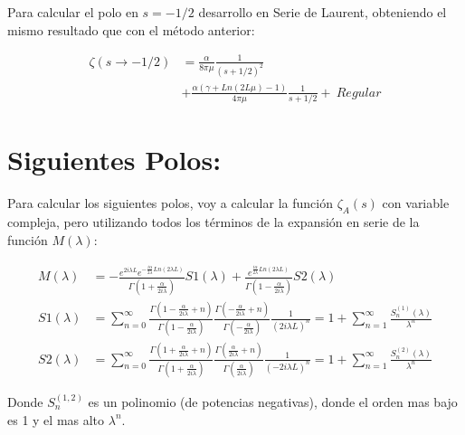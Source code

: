 Para calcular el polo en $s=-1/2$ desarrollo en Serie de Laurent, obteniendo el mismo resultado que con el método anterior:

\begin{equation}
\begin{aligned}
	\zeta (s \rightarrow -1/2) &= 
    \frac{\alpha}{8 \pi \mu } \frac{1}{(s+1/2)^2} \\
    &+
	\frac{\alpha ( \gamma  + Ln(2L \mu ) -1 )}{4 \pi \mu } \frac{1}{s+1/2} + \ Regular    
\end{aligned}
\label{eq.desarrollo}
\end{equation}



\section{Siguientes Polos:} 

Para calcular los siguientes polos, voy a calcular la función $\zeta _A (s) $ con variable compleja, pero utilizando todos los términos de la expansión en serie de la función $M ( \lambda )$:

\begin{equation}
\begin{aligned}
M( \lambda ) &= 
-
 \frac{e ^{2 i \lambda L } e ^{ - \frac{i \alpha  }{2 \lambda } Ln \left( 2 \lambda L \right) }  }
      { \Gamma \left( 1 + \frac{ \alpha}{2 i \lambda}  \right) } S1 ( \lambda ) +
 \frac{ e ^{   \frac{i \alpha  } {2 \lambda } Ln \left(2 \lambda L \right) } }
      { \Gamma \left( 1 - \frac{ \alpha}{2 i \lambda}  \right)   } S2 ( \lambda )  \\[10pt]      
S1 ( \lambda ) &= \sum _{n=0} ^{ \infty }
\frac{\Gamma (1 - \frac{ \alpha}{2 i \lambda} + n )}{\Gamma (1 - \frac{ \alpha}{2 i \lambda})} 
\frac{\Gamma (- \frac{ \alpha}{2 i \lambda} + n )}{\Gamma (- \frac{\alpha}{2 i \lambda})} 
\frac{1}{( 2 i \lambda L ) ^n} = 
1 + \sum _{n=1} ^{\infty} \frac{S ^{(1)} _n (\lambda)}{\lambda ^n} \\[10pt]
S2 (\lambda ) &= \sum _{n=0 } ^{\infty}
\frac{ \Gamma ( 1 + \frac{ \alpha}{2 i \lambda } + n ) }{\Gamma ( 1 + \frac{ \alpha}{2 i \lambda } )}
\frac{\Gamma ( \frac{ \alpha }{2 i \lambda} + n )}{\Gamma ( \frac{ \alpha }{2 i \lambda} )}
\frac{1}{( - 2 i \lambda L ) ^n} = 
1 + \sum _{n=1} ^{\infty} \frac{S ^{(2)} _n (\lambda)}{\lambda ^n}
\end{aligned}
\label{larga}
\end{equation}

Donde $S _n ^{(1,2)}$ es un polinomio (de potencias negativas), donde el orden mas bajo es 1 y el mas alto $\lambda ^n$. \\


